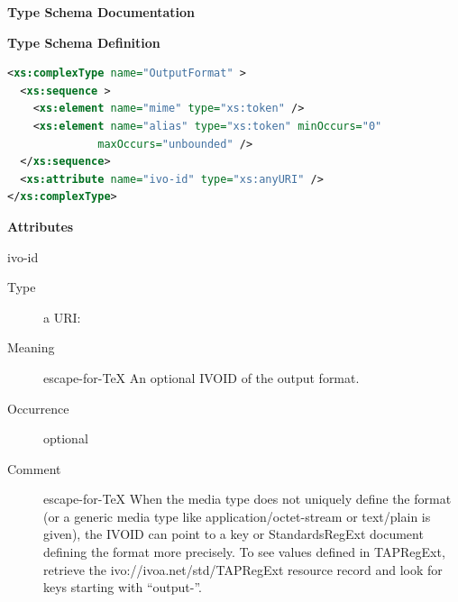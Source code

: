 \documentclass{ivoa}
\begin{document}
\begingroup
      	\renewcommand*\descriptionlabel[1]{%
      	\hbox to 5.5em{\emph{#1}\hfil}}\vspace{2ex}\noindent\textbf{ Type Schema Documentation}



\vspace{1ex}\noindent\textbf{ Type Schema Definition}

\begin{lstlisting}[language=XML,basicstyle=\footnotesize]
<xs:complexType name="OutputFormat" >
  <xs:sequence >
    <xs:element name="mime" type="xs:token" />
    <xs:element name="alias" type="xs:token" minOccurs="0"
              maxOccurs="unbounded" />
  </xs:sequence>
  <xs:attribute name="ivo-id" type="xs:anyURI" />
</xs:complexType>
\end{lstlisting}

\vspace{0.5ex}\noindent\textbf{ Attributes}

\begingroup\small\begin{bigdescription}
\item[ivo-id]
\begin{description}
\item[Type] a URI: 
\item[Meaning] escape-for-TeX{{{
        An optional IVOID of the output format.
        }}}
\item[Occurrence] optional
\item[Comment] escape-for-TeX{{{
          When the media type does not uniquely define the
          format (or a generic media type like application/octet-stream or
          text/plain is given), the IVOID can point to a key
          or StandardsRegExt document defining the format more
          precisely.  To see values defined in TAPRegExt,
          retrieve the ivo://ivoa.net/std/TAPRegExt
          resource record and look for keys starting with “output-”.
        }}}
\end{description}


\end{bigdescription}\endgroup
\end{document}
